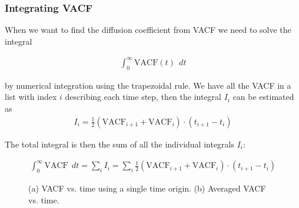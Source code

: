 \documentclass{article}
\begin{document}
\newpage
\subsubsection{Integrating VACF}

When we want to find the diffusion coefficient from VACF we need to solve the integral

\begin{align}
    \int_0^\infty \mathrm{VACF}(t) \ \ dt
\end{align}

by numerical integration using the trapezoidal rule.
We have all the VACF in a list with index $i$ describing each time step, then the integral $I_i$ can be estimated as
\begin{align}
    I_i = \frac{1}{2}(\mathrm{VACF}_{i+1} 
    + \mathrm{VACF}_i) \cdot (t_{i+1} - t_i)
\end{align}

The total integral is then the sum of all the individual integrals $I_i$:

\begin{align}
    \int_0^\infty \mathrm{VACF} \ \ dt = \sum_i I_i = \sum_i \frac{1}{2}(\mathrm{VACF}_{i+1} 
    + \mathrm{VACF}_i) \cdot (t_{i+1} - t_i)
\end{align}

\begin{figure}[htb]
	\centering
  \caption{
    (a) VACF vs. time using a single time origin.
    (b) Averaged VACF vs. time.
  }
\end{figure}
\end{document}
